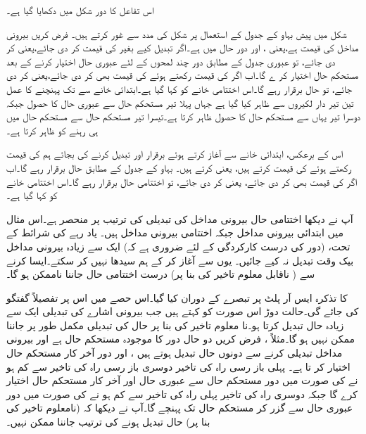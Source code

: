 اس تفاعل کا دور شکل میں دکھایا گیا ہے۔

 شکل میں پیش بہاو کے جدول کے استعمال پر شکل  کی مدد سے غور کرتے ہیں۔ فرض کریں بیرونی مداخل  کی قیمت  ہے،یعنی  ، اور دور حال  میں ہے۔اگر  تبدیل کیے بغیر  کی قیمت  کر دی جائے،یعنی  کر دی جائے، تو عبوری جدول کے مطابق دور چند لمحوں کے لئے عبوری حال  اختیار کرنے کے بعد مستحکم حال  اختیار کر ے گا۔اب اگر  کی قیمت  رکھتے ہوئے  کی قیمت بھی  کر دی جائے،یعنی  کر دی جائے، تو حال  برقرار رہے گا۔اس اختتامی خانے کو کہا گیا ہے۔ابتدائی خانے سے تک پہنچنے کا عمل تین تیر دار لکیروں سے ظاہر کیا گیا ہے جہاں پہلا تیر مستحکم حال  سے عبوری حال  کا حصول جبکہ دوسرا تیر یہاں سے مستحکم حال  کا حصول ظاہر کرتا ہے۔تیسرا تیر مستحکم حال  سے مستحکم حال  میں ہی رہنے کو ظاہر کرتا ہے۔

اس کے برعکس، ابتدائی خانے سے آغاز کرتے ہوئے  برقرار اور  تبدیل کرنے کی بجائے ہم  کی قیمت رکھتے ہوئے  کی قیمت  کرتے ہیں، یعنی  کرتے ہیں۔ بہاو کے جدول کے مطابق حال  برقرار رہے گا۔اب اگر  کی قیمت بھی  کر دی جائے، یعنی  کر دی جائے، تو اختتامی حال برقرار  رہے گا۔اس اختتامی خانے کو  کہا گیا ہے۔

آپ نے دیکھا اختتامی حال بیرونی مداخل کی تبدیلی کی ترتیب پر منحصر ہے۔اس مثال میں ابتدائی بیرونی مداخل  جبکہ اختتامی بیرونی مداخل  ہیں۔ یاد رہے  کی شرائط کے تحت، (دور کی درست کارکردگی کے لئے ضروری ہے کہ) ایک سے زیادہ بیرونی مداخل بیک وقت تبدیل نہ کیے جائیں۔ یوں  سے آغاز کر کے ہم سیدھا  نہیں کر سکتے۔ایسا کرنے سے ( ناقابل معلوم تاخیر کی بنا پر) درست اختتامی حال جاننا ناممکن ہو گا۔


 کا تذکرہ ایس آر پلٹ پر تبصرے کے دوران کیا گیا۔اس حصے میں اس پر تفصیلاً گفتگو کی جائے گی۔حالت دوڑ اس صورت کو کہتے ہیں جب بیرونی اشارے کی تبدیلی ایک سے زیادہ حال تبدیل کرتا ہو۔نا معلوم تاخیر کی بنا پر حال کی تبدیلی مکمل طور پر جاننا ممکن نہیں ہو گا۔مثلاً ، فرض کریں دو حال دور کا موجودہ مستحکم حال  ہے اور بیرونی مداخل تبدیلی کرنے سے دونوں حال تبدیل ہوتے ہیں ، اور دور آخر کار  مستحکم حال اختیار کر تا ہے۔ پہلی باز رسی راہ کی تاخیر دوسری باز رسی راہ کی تاخیر سے کم ہو نے کی صورت میں دور مستحکم حال  سے عبوری حال  اور آخر کار مستحکم حال  اختیار کرے گا جبکہ دوسری راہ کی تاخیر پہلی راہ کی تاخیر سے کم ہو نے کی صورت میں دور عبوری حال  سے گزر کر مستحکم حال  تک پہنچے گا۔آپ نے دیکھا کہ (نامعلوم تاخیر کی بنا پر) حال تبدیل ہونے کی ترتیب جاننا ممکن نہیں۔


